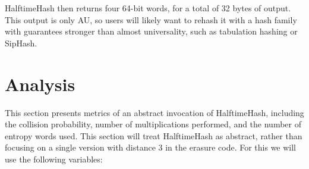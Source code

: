 \documentclass[sigconf, nonacm]{acmart}
\begin{document}
HalftimeHash then returns four 64-bit words, for a total of 32 bytes of output.
This output is only AU, so users will likely want to rehash it with a hash family with guarantees stronger than almost universality, such as tabulation hashing or SipHash. \cite{tabulation,siphash}








\section{Analysis}

This section presents metrics of an abstract invocation of HalftimeHash, including the collision probability, number of multiplications performed, and the number of entropy words used.
This section will treat HalftimeHash as abstract, rather than focusing on a single version with distance 3 in the erasure code.
For this we will use the following variables:
\end{document}
